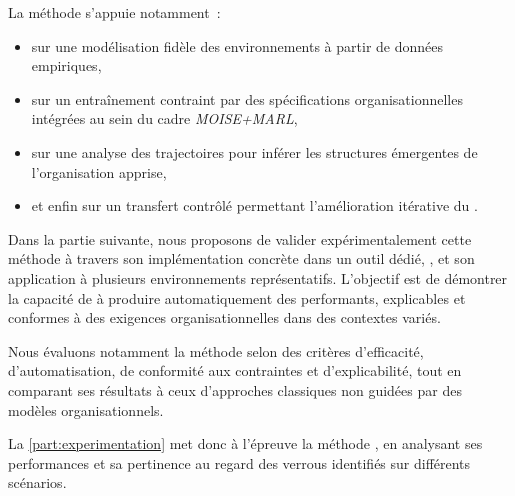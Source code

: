 \medskip

\noindent
La méthode s'appuie notamment~:
\begin{itemize}
  \item sur une modélisation fidèle des environnements à partir de données empiriques,
  \item sur un entraînement contraint par des spécifications organisationnelles intégrées au sein du cadre \textit{MOISE+MARL},
  \item sur une analyse des trajectoires pour inférer les structures émergentes de l'organisation apprise,
  \item et enfin sur un transfert contrôlé permettant l'amélioration itérative du .
\end{itemize}

\noindent
Dans la partie suivante, nous proposons de valider expérimentalement cette méthode à travers son implémentation concrète dans un outil dédié, , et son application à plusieurs environnements représentatifs. L'objectif est de démontrer la capacité de  à produire automatiquement des  performants, explicables et conformes à des exigences organisationnelles dans des contextes variés.

\medskip

\noindent
Nous évaluons notamment la méthode selon des critères d'efficacité, d'automatisation, de conformité aux contraintes et d'explicabilité, tout en comparant ses résultats à ceux d'approches classiques non guidées par des modèles organisationnels.

\bigskip

La \autoref{part:experimentation} met donc à l'épreuve la méthode , en analysant ses performances et sa pertinence au regard des verrous identifiés sur différents scénarios.
